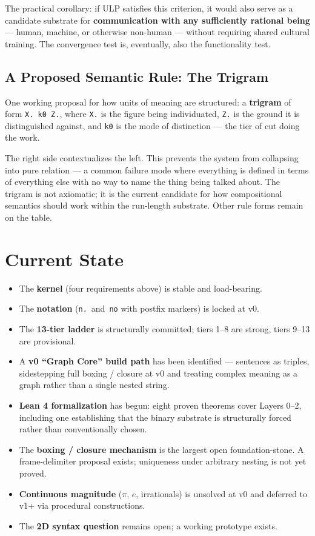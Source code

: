 \documentclass[11pt, letterpaper]{article}
\begin{document}
The practical corollary: if ULP satisfies this criterion, it would also serve as a candidate substrate for \textbf{communication with any sufficiently rational being} --- human, machine, or otherwise non-human --- without requiring shared cultural training. The convergence test is, eventually, also the functionality test.

\subsection{A Proposed Semantic Rule: The Trigram}

One working proposal for how units of meaning are structured: a \textbf{trigram} of form \texttt{X. k0 Z.}, where \texttt{X.} is the figure being individuated, \texttt{Z.} is the ground it is distinguished against, and \texttt{k0} is the mode of distinction --- the tier of cut doing the work.

The right side contextualizes the left. This prevents the system from collapsing into pure relation --- a common failure mode where everything is defined in terms of everything else with no way to name the thing being talked about. The trigram is not axiomatic; it is the current candidate for how compositional semantics should work within the run-length substrate. Other rule forms remain on the table.

\section{Current State}

\begin{itemize}[leftmargin=*, itemsep=0.35em]
    \item The \textbf{kernel} (four requirements above) is stable and load-bearing.
    \item The \textbf{notation} (\texttt{n.}~and~\texttt{no} with postfix markers) is locked at v0.
    \item The \textbf{13-tier ladder} is structurally committed; tiers 1--8 are strong, tiers 9--13 are provisional.
    \item A \textbf{v0 ``Graph Core'' build path} has been identified --- sentences as triples, sidestepping full boxing / closure at v0 and treating complex meaning as a graph rather than a single nested string.
    \item \textbf{Lean 4 formalization} has begun: eight proven theorems cover Layers 0--2, including one establishing that the binary substrate is structurally forced rather than conventionally chosen.
    \item The \textbf{boxing / closure mechanism} is the largest open foundation-stone. A frame-delimiter proposal exists; uniqueness under arbitrary nesting is not yet proved.
    \item \textbf{Continuous magnitude} ($\pi$, $e$, irrationals) is unsolved at v0 and deferred to v1+ via procedural constructions.
    \item The \textbf{2D syntax question} remains open; a working prototype exists.
\end{itemize}
\end{document}
